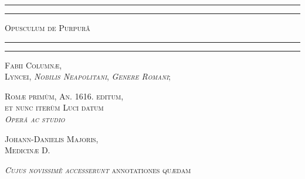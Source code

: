\documentclass[a4paper, 11pt, oneside, polutonikogreek, german]{article}
\begin{document}
\begin{titlepage} %
	\centering %

	
	\rule{\textwidth}{1.6pt}\vspace*{-\baselineskip}\vspace*{2pt} %
	\rule{\textwidth}{0.4pt} %
	
	\vspace{1\baselineskip} %
	
	{\scshape\Huge Opusculum de Purpurâ}
	
	\vspace{1\baselineskip} %

	\rule{\textwidth}{0.4pt}\vspace*{-\baselineskip}\vspace{3.2pt} %
	\rule{\textwidth}{1.6pt} %
	
	\vspace{1\baselineskip} %
	
	
	{\scshape \Large Fabii Columnæ,\\\large Lyncei, \emph{Nobilis Neapolitani}, \emph{Genere Romani}; }
 
        \vspace{0.5\baselineskip}

        {\scshape \small Romæ primùm, An. 1616. editum,\\et nunc iterùm Luci datum \\\emph{Operâ ac studio} }

        \vspace{0.5\baselineskip}
        
        {\scshape \Large Johann-Danielis Majoris,\\\normalsize Medicinæ D. } %
	
	\vspace*{1\baselineskip} %
	
        {\scshape \normalsize \emph{Cujus novissimè accesserunt} annotationes quædam} %


\end{titlepage}
\end{document}
